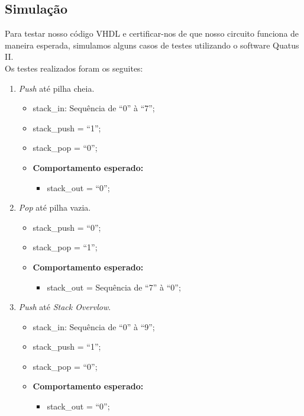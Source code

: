 \documentclass{article}
\begin{document}
\subsection{Simulação}

Para testar nosso código VHDL e certificar-nos de que nosso circuito funciona de maneira esperada, simulamos alguns casos de testes utilizando o software Quatus II.\\

Os testes realizados foram os seguites:

\begin{enumerate}
    \item \textit{Push} até pilha cheia.
    \begin{itemize}
        \item stack\_in: Sequência de ``0'' à ``7'';
        \item stack\_push = ``1'';
        \item stack\_pop = ``0'';
        \item \textbf{Comportamento esperado:}
        \begin{itemize}
            \item stack\_out = ``0'';
        \end{itemize}
    \end{itemize}

    \item \textit{Pop} até pilha vazia.
    \begin{itemize}
        \item stack\_push = ``0'';
        \item stack\_pop = ``1'';
        \item \textbf{Comportamento esperado:}
        \begin{itemize}
            \item stack\_out = Sequência de ``7'' à ``0'';
        \end{itemize}
    \end{itemize}

    \item \textit{Push} até \textit{Stack Overvlow}.
    \begin{itemize}
        \item stack\_in: Sequência de ``0'' à ``9'';
        \item stack\_push = ``1'';
        \item stack\_pop = ``0'';
        \item \textbf{Comportamento esperado:}
        \begin{itemize}
            \item stack\_out = ``0'';
        \end{itemize}
    \end{itemize}


\end{enumerate}
\end{document}
